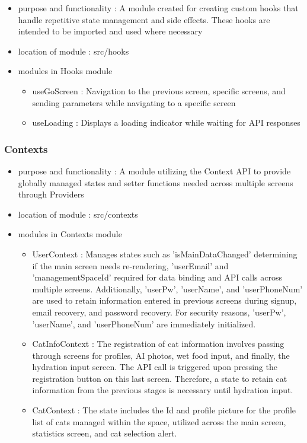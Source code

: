 \documentclass[conference]{IEEEtran}
\begin{document}
\begin{itemize}
    \item purpose and functionality : A module created for creating custom hooks that handle repetitive state management and side effects. These hooks are intended to be imported and used where necessary
    \item location of module : src/hooks
    \item modules in Hooks module
    \begin{itemize}
        \item useGoScreen : Navigation to the previous screen, specific screens, and sending parameters while navigating to a specific screen
        \item useLoading : Displays a loading indicator while waiting for API responses
        \vspace{0.5cm}
    \end{itemize}
\end{itemize}

\subsubsection{Contexts}

\begin{itemize}
    \item purpose and functionality : A module utilizing the Context API to provide globally managed states and setter functions needed across multiple screens through Providers
    \item location of module : src/contexts
    \item modules in Contexts module
    \begin{itemize}
        \item UserContext : Manages states such as 'isMainDataChanged' determining if the main screen needs re-rendering, 'userEmail' and 'managementSpaceId' required for data binding and API calls across multiple screens. Additionally, 'userPw', 'userName', and 'userPhoneNum' are used to retain information entered in previous screens during signup, email recovery, and password recovery. For security reasons, 'userPw', 'userName', and 'userPhoneNum' are immediately initialized.
        \item CatInfoContext : The registration of cat information involves passing through screens for profiles, AI photos, wet food input, and finally, the hydration input screen. The API call is triggered upon pressing the registration button on this last screen. Therefore, a state to retain cat information from the previous stages is necessary until hydration input.
        \item CatContext : The state includes the Id and profile picture for the profile list of cats managed within the space, utilized across the main screen, statistics screen, and cat selection alert.
        \vspace{0.5cm}
    \end{itemize}
\end{itemize}
\end{document}
